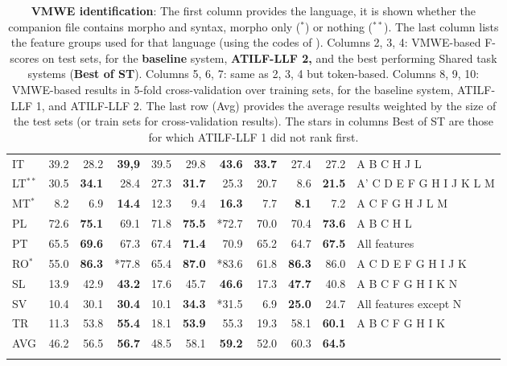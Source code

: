 \documentclass[output=paper,modfonts]{langscibook}
\begin{document}
\begin{table}
{\begin{tabular}{lrrrrrrrrrl}
IT 	& 39.2 			& 28.2 			& \textbf{39,9} & 39.5 & 29.8 & \textbf{43.6} & \textbf{33.7} & 27.4 & 27.2 & \scriptsize{A B C H J L} \\
LT$^{**}$ 	& 30.5 			& \textbf{34.1} & 28.4 & 27.3 & \textbf{31.7} & 25.3 & 20.7 & 8.6 & \textbf{21.5} & \scriptsize{A' C D E F G H I J K L M} \\
MT$^{*}$ 	& 8.2 			& 6.9 			& \textbf{14.4} & 12.3 & 9.4 & \textbf{16.3} & 7.7 & \textbf{8.1} & 7.2 & \scriptsize{A C F G H J L M} \\
PL 	& 72.6 			& \textbf{75.1} & 69.1 & 71.8 & \textbf{75.5} & *72.7 & 70.0 & 70.4 & \textbf{73.6} & \scriptsize{A B C H L} \\ 
PT 	& 65.5 			& \textbf{69.6} & 67.3 & 67.4 & \textbf{71.4} & 70.9 & 65.2 & 64.7 & \textbf{67.5} & \scriptsize{All features} \\
RO$^{*}$ 	& 55.0 			& \textbf{86.3} & *77.8 & 65.4 & \textbf{ 87.0} & *83.6 & 61.8 & \textbf{86.3} & 86.0 & \scriptsize{A C D E F G H I J K} \\
SL 	& 13.9 			& 42.9 			& \textbf{ 43.2} & 17.6 & 45.7 & \textbf{46.6} & 17.3 & \textbf{47.7} & 40.8 & \scriptsize{A B C F G H I K N} \\
SV 	& 10.4 			& 30.1 			& \textbf{30.4} & 10.1 & \textbf{34.3} & *31.5 & 6.9 & \textbf{25.0} & 24.7 & \scriptsize{All features except N} \\
TR 	& 11.3 			& 53.8 			& \textbf{55.4} & 18.1 & \textbf{53.9} & 55.3 & 19.3 & 58.1 & \textbf{60.1} & \scriptsize{A B C F G H I K} \\ \midrule
AVG & 46.2 & 56.5 & \textbf{56.7} & 48.5 & 58.1 & \textbf{59.2} & 52.0 & 60.3 & \textbf{64.5} &  \\
\lspbottomrule
\end{tabular}
}
\caption{\textbf{VMWE identification}: The first column provides the language, it is shown whether the companion file contains morpho and syntax, morpho only ($^{*}$) or nothing ($^{**}$). The last column lists the feature groups used for that language (using the codes of ). Columns  2, 3, 4: VMWE-based F-scores on test sets, for the \textbf{baseline} system, \textbf{ATILF-LLF 2, }and the best performing Shared task systems (\textbf{Best of ST}). Columns 5, 6, 7: same as 2, 3, 4 but token-based. Columns 8, 9, 10: VMWE-based results in 5-fold cross-validation over training sets, for the baseline system, ATILF-LLF 1, and ATILF-LLF 2.  The last row (Avg) provides the average results weighted by the size of the test sets (or train sets for cross-validation results). The stars in columns Best of ST are those for which ATILF-LLF 1 did not rank first.}
\label{tab:iden}
\end{table}
\end{document}
